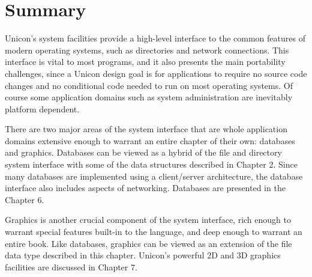 \section{Summary}

Unicon's system facilities provide a high-level interface to the
common features of modern operating systems, such as directories and
network connections. This interface is vital to most programs, and it
also presents the main portability challenges, since a Unicon design
goal is for applications to require no source code
changes and no conditional code needed to run on most operating
systems. Of course some application domains such as system
administration are inevitably platform dependent.

There are two major areas of the system interface that are whole application
domains extensive enough to warrant an entire chapter of their own:
databases and graphics. Databases can be viewed as a hybrid of
the file and directory system interface with some of the data structures
described in Chapter 2. Since many databases are implemented using a
client/server architecture, the database interface also includes aspects of
networking. Databases are presented in the Chapter 6.

Graphics is another crucial component of the system interface, rich
enough to warrant special features built-in to the language, and deep
enough to warrant an entire book. Like databases, graphics can be
viewed as an extension of the file data type described in this
chapter.  Unicon's powerful 2D and 3D graphics facilities are
discussed in Chapter 7.

